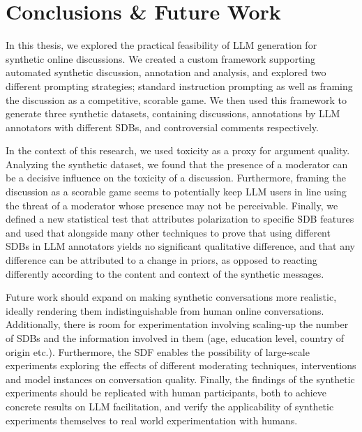 %
\chapter{Conclusions \& Future Work}
\label{sec:conclusions}

In this thesis, we explored the practical feasibility of LLM generation for synthetic online discussions. We created a custom framework supporting automated synthetic discussion, annotation and analysis, and explored two different prompting strategies; standard instruction prompting as well as framing the discussion as a competitive, scorable game. We then used this framework to generate three synthetic datasets, containing discussions, annotations by LLM annotators with different \acp{SDB}, and controversial comments respectively. 

In the context of this research, we used toxicity as a proxy for argument quality. Analyzing the synthetic dataset, we found that the presence of a moderator can be a decisive influence on the toxicity of a discussion. Furthermore, framing the discussion as a scorable game seems to potentially keep LLM users in line using the threat of a moderator whose presence may not be perceivable. Finally, we defined a new statistical test that attributes polarization to specific \ac{SDB} features and used that alongside many other techniques to prove that using different \acp{SDB} in LLM annotators yields no significant qualitative difference, and that any difference can be attributed to a change in priors, as opposed to reacting differently according to the content and context of the synthetic messages.

Future work should expand on making synthetic conversations more realistic, ideally rendering them indistinguishable from human online conversations. Additionally, there is room for experimentation involving scaling-up the number of \acp{SDB} and the information involved in them (age, education level, country of origin etc.). Furthermore, the \ac{SDF} enables the possibility of large-scale experiments exploring the effects of different moderating techniques, interventions and model instances on conversation quality. Finally, the findings of the synthetic experiments should be replicated with human participants, both to achieve concrete results on LLM facilitation, and verify the applicability of synthetic experiments themselves to real world experimentation with humans.